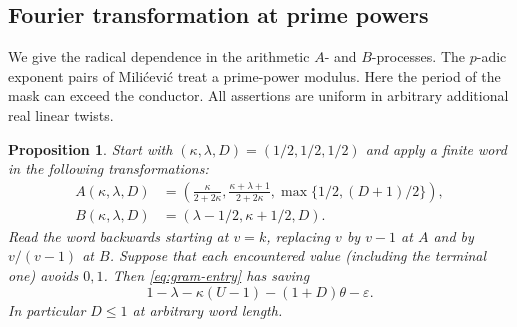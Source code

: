 \documentclass[11pt,letterpaper]{article}
\newtheorem{proposition}[proposition]{Proposition}
\theoremstyle{definition}
\newcommand{\eps}{\varepsilon}
\begin{document}
\subsection{Fourier transformation at prime powers}
We give the radical dependence in the arithmetic $A$- and $B$-processes.
The $p$-adic exponent pairs of Mili\'cevi\'c \cite{Mili} treat a
prime-power modulus. Here the period of the mask can exceed the conductor.
All assertions are uniform in arbitrary additional real linear twists.

\begin{proposition}\label{prop:pairs}
Start with $(\kappa,\lambda,D)=(1/2,1/2,1/2)$ and apply a finite word
in the following transformations:
\begin{align*}
 A(\kappa,\lambda,D)
 &=\left(\frac{\kappa}{2+2\kappa},
 \frac{\kappa+\lambda+1}{2+2\kappa},
 \max\{1/2,(D+1)/2\}\right),\\
 B(\kappa,\lambda,D)&=(\lambda-1/2,\kappa+1/2,D).
\end{align*}
Read the word backwards starting at $v=k$, replacing $v$ by $v-1$ at
$A$ and by $v/(v-1)$ at $B$. Suppose that each encountered value
(including the terminal one) avoids $0,1$. Then \eqref{eq:gram-entry}
has saving
\begin{equation}\label{eq:pair-score}
 1-\lambda-\kappa(U-1)-(1+D)\theta-\eps .
\end{equation}
In particular $D\le1$ at arbitrary word length.
\end{proposition}
\end{document}
